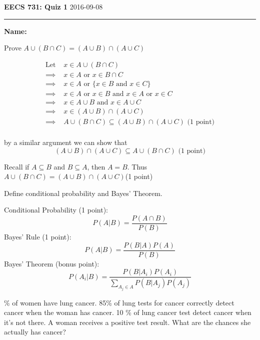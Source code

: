 \documentclass[draft]{exam} %
\theoremstyle{definition} \newtheorem*{defn}{Definition}
\begin{document}
\noindent\textbf{\large{EECS 731: Quiz 1}} \hfill 2016-09-08
\hrule \bigskip
\noindent \textbf{Name:} \underline{\hspace{200pt}}

\begin{questions} \printanswers

\question[3] Prove $A \cup (B \cap C) = (A \cup 
B) \cap (A \cup C)$ 

\begin{solution}  %
\begin{align*}
\text{Let } &x \in A \cup (B \cap C) \\
\implies &x \in A \text{ or } x \in B \cap C \\
\implies &x \in A \text{ or } \{x \in B \text{ and } x \in C\} \\
\implies &x \in A \text{ or } x \in B \text{ and } x \in A \text{ or } x \in C \\
\implies &x \in A \cup B \text{ and } x \in A \cup C \\
\implies &x \in (A \cup B) \cap (A \cup C) \\
\implies &A \cup (B \cap C) \subseteq (A \cup B) \cap (A \cup C) \text{ (1 point)}\\
\end{align*}


by a similar argument we can show that
\[(A \cup B) \cap (A \cup C) \subseteq A \cup (B \cap C) \text{ (1 point)}\]

Recall if $A \subseteq B$ and 
$B \subseteq A$, then $A=B$. Thus $A \cup (B \cap C) = (A \cup 
B) \cap (A \cup C)$(1 point)
\end{solution}

\question[2] Define conditional probability and Bayes' Theorem.
\begin{solution}
Conditional Probability (1 point):
\[P(A|B)=\frac{P(A\cap B)}{P(B)}\]
Bayes' Rule (1 point):
\[P(A|B)=\frac{P(B|A)P(A)}{P(B)}\]
Bayes' Theorem (bonus point):
\[P(A_i|B)=\frac{P(B|A_i)P(A_i)}{\sum_{A_j \in A}P(B|A_j)P(A_j)}\]
\end{solution} %

\% of women have lung cancer. 85\% of lung tests for cancer
correctly detect cancer when the woman has cancer. 10 \% of lung cancer
test detect cancer when it's not there. A woman receives a positive test
result. What are the chances she actually has cancer?


\end{questions}
\end{document}
